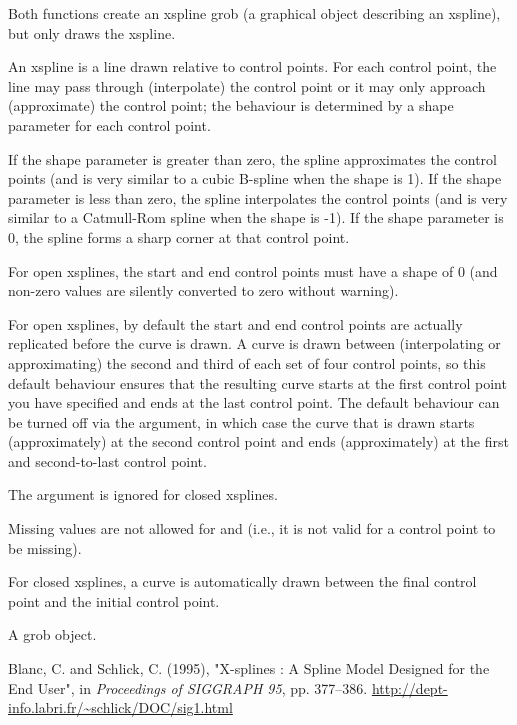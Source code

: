 \begin{Details}\relax
Both functions create an xspline grob (a graphical object describing an
xspline), but only 
draws the xspline.

An xspline is a line drawn relative to control points.  For each
control point, the line
may pass through (interpolate) the control point or it
may only approach (approximate) the control
point;  the behaviour is determined by a shape parameter for each
control point.

If the shape parameter is greater than zero, the spline
approximates the control points (and is
very similar to a cubic B-spline when the shape is
1).  If the shape parameter is less than zero, the spline interpolates
the control points (and is very similar to a Catmull-Rom spline when
the shape is -1).  If the shape parameter is 0, the spline forms a
sharp corner at that control point.

For open xsplines, the start and end control points must have a shape
of 0 (and non-zero values are silently converted to zero without warning).

For open xsplines, by default the start and end control points are
actually replicated before the curve is drawn.  A curve is drawn
between (interpolating or approximating)
the second and third of each set of four control points, so
this default behaviour ensures that
the resulting curve starts at the first control point you have
specified and ends at the last control point.  
The default
behaviour can be turned off via the  argument,
in which case the curve that is drawn starts (approximately) at
the second control point and ends (approximately) at the first and
second-to-last control point.

The  argument is ignored for closed xsplines.

Missing values are not allowed for  and 
(i.e., it is not valid for a control point to be missing).

For closed xsplines, a curve is automatically drawn 
between the final control point and the initial control point.
\end{Details}
%
\begin{Value}
A grob object.
\end{Value}
%
\begin{References}\relax
Blanc, C. and Schlick, C. (1995),
"X-splines : A Spline Model Designed for the End User",
in \emph{Proceedings of SIGGRAPH 95}, pp. 377--386. 
\url{http://dept-info.labri.fr/~schlick/DOC/sig1.html}
\end{References}

